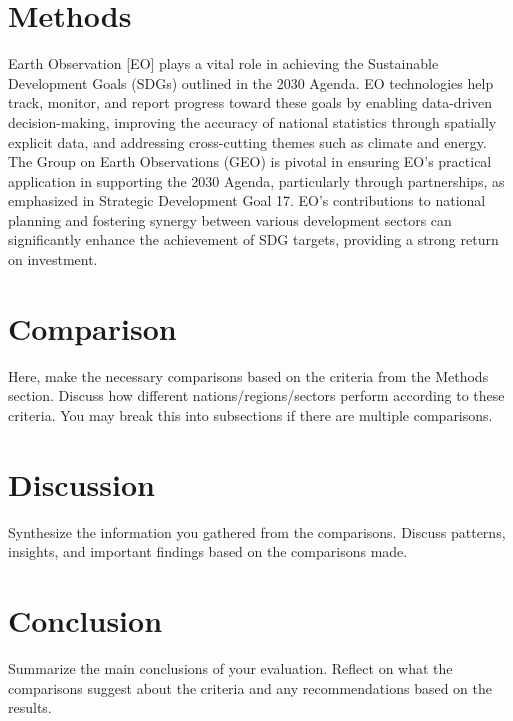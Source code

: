\documentclass[12pt]{article}
\begin{document}




\pagebreak
\section*{Methods}
Earth Observation [EO] plays a vital role in achieving the Sustainable Development Goals (SDGs) outlined in the 2030 Agenda. EO technologies help track, monitor, 
and report progress toward these goals by enabling data-driven decision-making, improving the accuracy of national statistics through spatially explicit data, and 
addressing cross-cutting themes such as climate and energy. The Group on Earth Observations (GEO) is pivotal in ensuring EO's practical application in 
supporting the 2030 Agenda, particularly through partnerships, as emphasized in Strategic Development Goal 17. EO's contributions to national planning and fostering 
synergy between various development sectors can significantly enhance the achievement of SDG targets, providing a strong return on investment.


\section*{Comparison}
Here, make the necessary comparisons based on the criteria from the Methods section. Discuss how different nations/regions/sectors perform according to these criteria. You may break this into subsections if there are multiple comparisons.

\section*{Discussion}
Synthesize the information you gathered from the comparisons. Discuss patterns, insights, and important findings based on the comparisons made.

\section*{Conclusion}
Summarize the main conclusions of your evaluation. Reflect on what the comparisons suggest about the criteria and any recommendations based on the results.

\newpage
\printbibliography
\end{document}
